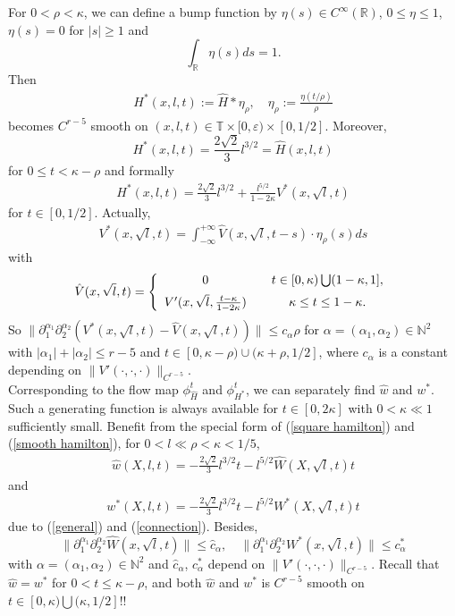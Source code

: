 \documentclass{amsart}
\begin{document}
For $0<\rho<\kappa$, we can define a bump function by $\eta(s)\in C^\infty({\mathbb{R}})$, $0\leq\eta\leq 1$, $\eta(s)=0$ for $|s|\geq1$ and
\[
\int_{\mathbb{R}}\eta(s)ds=1.
\]
Then
\begin{eqnarray}
H^*(x,l,t):=\hat{H}*\eta_\rho,\quad\eta_\rho:=\frac{\eta(t/\rho)}{\rho}
\end{eqnarray}
becomes $C^{r-5}$ smooth on $(x,l,t)\in{\mathbb{T}}\times[0,{\varepsilon})\times[0,1/2]$. Moreover, 
\[
H^*(x,l,t)=\frac{2\sqrt{2}}{3}l^{3/2}=\hat{H}(x,l,t)
\] 
for $0\leq t<\kappa-\rho$ and formally 
\begin{eqnarray}\label{smooth hamilton}
H^*(x,l,t)=\frac{2\sqrt{2}}{3}l^{3/2}+\frac{l^{5/2}}{1-2\kappa}V^*(x,\sqrt{l},t)
\end{eqnarray} 
for $t\in[0,1/2]$. Actually,
\begin{eqnarray}
V^*(x,\sqrt{l},t)=\int_{-\infty}^{+\infty}\hat{V}(x,\sqrt{l},t-s)\cdot\eta_\rho(s)ds
\end{eqnarray}
with
\begin{eqnarray}
\hat{V}(x,\sqrt{l},t)=\left\{
\begin{array}{cccccc}
0 & & t\in[0,\kappa)\bigcup(1-\kappa,1],\vspace{5pt}\\
V'(x,\sqrt{l},\frac{t-\kappa}{1-2\kappa})& & \kappa\leq t\leq 1-\kappa.
\end{array}\right.
\end{eqnarray}
So $\|\partial_1^{\alpha_1}\partial_2^{\alpha_2}(V^*(x,\sqrt{l},t)-\hat{V}(x,\sqrt{l},t))\|\leq c_\alpha\rho$ for $\alpha=(\alpha_1,\alpha_2)\in\mathbb{N}^2$ with $|\alpha_1|+|\alpha_2|\leq r-5$ and $t\in[0,\kappa-\rho)\cup(\kappa+\rho,1/2]$, where $c_\alpha$ is a constant depending on $\|V'(\cdot,\cdot,\cdot)\|_{C^{r-5}}$.\\

Corresponding to the flow map $\phi_{\hat{H}}^t$ and $\phi_{H^*}^t$, we can separately find $\hat{w}$ and $w^*$.  Such a generating function is always available for $t\in[0,2\kappa]$ with $0<\kappa\ll1$ sufficiently small. Benefit from the special form of (\ref{square hamilton}) and (\ref{smooth hamilton}), for $0<l\ll\rho<\kappa<1/5$, 
\begin{eqnarray}\label{sp1}
\hat{w}(X,l,t)=-\frac{2\sqrt{2}}{3}l^{3/2}t-l^{5/2}\hat{W}(X,\sqrt{l},t)t
\end{eqnarray}
and 
\begin{eqnarray}\label{sp2}
w^*(X,l,t)=-\frac{2\sqrt{2}}{3}l^{3/2}t-l^{5/2}W^*(X,\sqrt{l},t)t
\end{eqnarray}
due to (\ref{general}) and (\ref{connection}). Besides, 
\[
\|\partial_1^{\alpha_1}\partial_2^{\alpha_2}\hat{W}(x,\sqrt{l},t)\|\leq \hat{c}_\alpha,\quad\|\partial_1^{\alpha_1}\partial_2^{\alpha_2}W^*(x,\sqrt{l},t)\|\leq c_\alpha^*
\] 
with $\alpha=(\alpha_1,\alpha_2)\in\mathbb{N}^2$ and $\hat{c}_\alpha$, $c_\alpha^*$ depend on $\|V'(\cdot,\cdot,\cdot)\|_{C^{r-5}}$. Recall that $\hat{w}=w^*$ for $0<t\leq\kappa-\rho$, and both $\hat{w}$  and $w^*$ is $C^{r-5}$ smooth on $t\in[0,\kappa)\bigcup(\kappa,1/2]$!!\\
\end{document}
